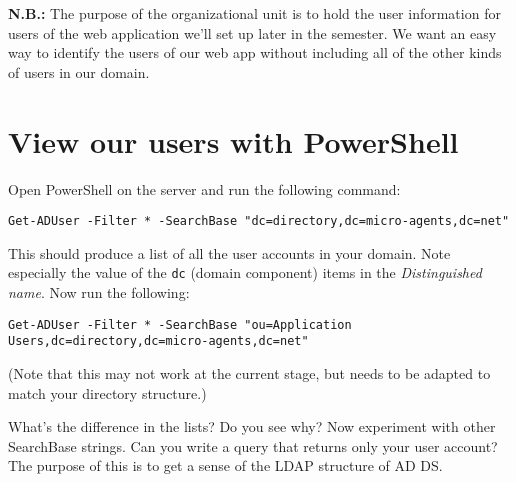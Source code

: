 \documentclass{article}
\begin{document}
\textbf{N.B.:} The purpose of the organizational unit is to hold the user information for users of the web application we'll set up later in the semester. We want an easy way to identify the users of our web app without including all of the other kinds of users in our domain.

\section{View our users with PowerShell}
Open PowerShell on the server and run the following command: 

\texttt{Get-ADUser -Filter * -SearchBase "dc=directory,dc=micro-agents,dc=net"}

This should produce a list of all the user accounts in your domain.  Note especially the value of the \texttt{dc} (domain component) items in the \emph{Distinguished name}. Now run the following:

\texttt{Get-ADUser -Filter * -SearchBase "ou=Application Users,dc=directory,dc=micro-agents,dc=net"}

(Note that this may not work at the current stage, but needs to be adapted to match your directory structure.)

What's the difference in the lists? Do you see why?  Now experiment with other SearchBase strings. Can you write a query that returns only your user account? The purpose of this is to get a sense of the LDAP
structure of AD DS.
\end{document}
